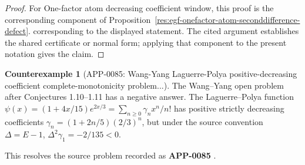 \documentclass[11pt]{article}
\numberwithin{equation}{section}
\theoremstyle{definition}
\newtheorem{counterexample}[theorem]{Counterexample}
\theoremstyle{remark}
\newcommand{\1}{\mathbf 1}
\begin{document}
\begin{proof}
For One-factor atom decreasing coefficient window, this proof is the corresponding component of Proposition~\ref{res:egf-onefactor-atom-seconddifference-defect}.  corresponding to the displayed statement.  The cited argument establishes the shared certificate or normal form; applying that component to the present notation gives the claim.
\end{proof}

\begin{counterexample}[APP-0085: Wang-Yang Laguerre-Polya positive-decreasing coefficient complete-monotonicity problem...]
\label{res:wangyang-lp-positivedecreasing-cm-openproblem-refuted}
The Wang--Yang open problem after Conjectures 1.10--1.11 has a negative answer. The Laguerre--Polya function \(\psi(x)=(1+4x/15)e^{2x/3}=\sum_{n\ge0}\gamma_n x^n/n!\) has positive strictly decreasing coefficients \(\gamma_n=(1+2n/5)(2/3)^n\), but under the source convention \(\Delta=E-1\), \(\Delta^2\gamma_1=-2/135<0\).



This resolves the source problem recorded as \textbf{APP-0085} \cite{app-app-0085-source}.
\end{counterexample}
\end{document}
